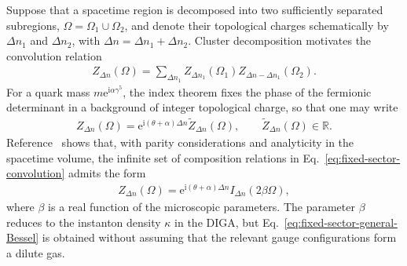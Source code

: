 \documentclass[review]{elsarticle}
\numberwithin{equation}{section}
\numberwithin{table}{section}
\numberwithin{figure}{section}
\def\i{\mathrm{i}}
\def\e{\mathrm{e}}
\begin{document}
Suppose that a spacetime region is decomposed into two sufficiently separated subregions, $\Omega=\Omega_1\cup\Omega_2$, and denote their topological charges schematically by $\Delta n_1$ and $\Delta n_2$, with $\Delta n=\Delta n_1+\Delta n_2$. Cluster decomposition motivates the convolution relation
\begin{align}
    Z_{\Delta n}(\Omega)
    =
    \sum_{\Delta n_1}
    Z_{\Delta n_1}(\Omega_1)
    Z_{\Delta n-\Delta n_1}(\Omega_2).
    \label{eq:fixed-sector-convolution}
\end{align}
For a quark mass $m\e^{\i\alpha\gamma^5}$, the index theorem fixes the phase of the fermionic determinant in a background of integer topological charge, so that one may write
\begin{align}
    Z_{\Delta n}(\Omega)
    =
    \e^{\i(\theta+\alpha)\Delta n}
    \widetilde Z_{\Delta n}(\Omega),
    \qquad
    \widetilde Z_{\Delta n}(\Omega)\in\mathbb R.
    \label{eq:fixed-sector-general-phase}
\end{align}
Reference~\cite{Ai:2020ptm} shows that, with parity considerations and analyticity in the spacetime volume, the infinite set of composition relations in Eq.~\eqref{eq:fixed-sector-convolution} admits the form
\begin{align}
    Z_{\Delta n}(\Omega)
    =
    \e^{\i(\theta+\alpha)\Delta n}
    I_{\Delta n}(2\beta\Omega),
    \label{eq:fixed-sector-general-Bessel}
\end{align}
where $\beta$ is a real function of the microscopic parameters. The parameter $\beta$ reduces to the instanton density $\kappa$ in the DIGA, but Eq.~\eqref{eq:fixed-sector-general-Bessel} is obtained without assuming that the relevant gauge configurations form a dilute gas. 
\end{document}

